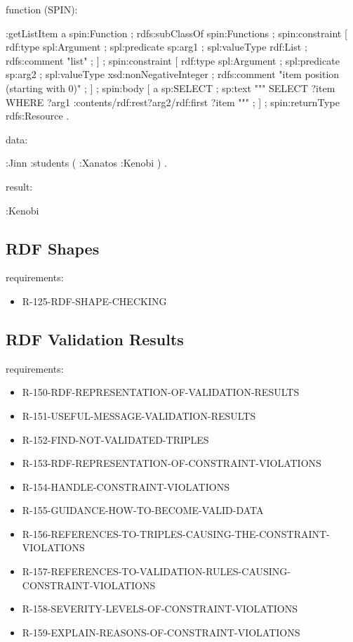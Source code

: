 \documentclass{llncs}
\begin{document}
function (SPIN):

\begin{ex}
:getListItem
    a spin:Function ; rdfs:subClassOf spin:Functions ;
    spin:constraint [
        rdf:type spl:Argument ;
        spl:predicate sp:arg1 ;
        spl:valueType rdf:List ;
        rdfs:comment "list" ; ] ;
    spin:constraint [
        rdf:type spl:Argument ;
        spl:predicate sp:arg2 ;
        spl:valueType xsd:nonNegativeInteger ;
        rdfs:comment "item position (starting with 0)" ; ] ;
    spin:body [
        a sp:SELECT ;
        sp:text """
            SELECT ?item
            WHERE {
                ?arg1 :contents/rdf:rest{?arg2}/rdf:first ?item } """ ; ] ;
    spin:returnType rdfs:Resource .
\end{ex}

data:

\begin{ex}
:Jinn :students 
     ( :Xanatos :Kenobi ) . 
\end{ex}

result:

\begin{ex}
:Kenobi
\end{ex}

\subsection{RDF Shapes}

requirements:

\begin{itemize}
	\item R-125-RDF-SHAPE-CHECKING
\end{itemize}

\subsection{RDF Validation Results}

requirements:

\begin{itemize}
	\item R-150-RDF-REPRESENTATION-OF-VALIDATION-RESULTS
	\item R-151-USEFUL-MESSAGE-VALIDATION-RESULTS
	\item R-152-FIND-NOT-VALIDATED-TRIPLES
	\item R-153-RDF-REPRESENTATION-OF-CONSTRAINT-VIOLATIONS
	\item R-154-HANDLE-CONSTRAINT-VIOLATIONS
	\item R-155-GUIDANCE-HOW-TO-BECOME-VALID-DATA
	\item R-156-REFERENCES-TO-TRIPLES-CAUSING-THE-CONSTRAINT-VIOLATIONS
	\item R-157-REFERENCES-TO-VALIDATION-RULES-CAUSING-CONSTRAINT-VIOLATIONS
	\item R-158-SEVERITY-LEVELS-OF-CONSTRAINT-VIOLATIONS
	\item R-159-EXPLAIN-REASONS-OF-CONSTRAINT-VIOLATIONS
\end{itemize}
\end{document}
